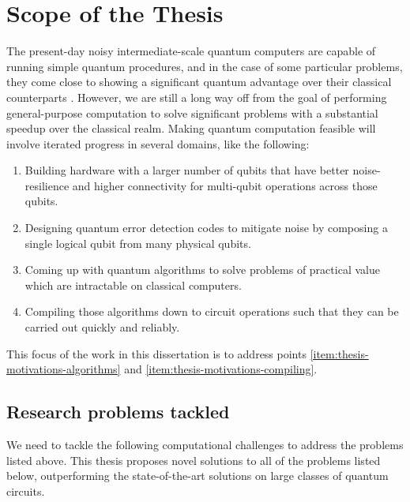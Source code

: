 \section{Scope of the Thesis}

The present-day noisy intermediate-scale quantum computers are capable of running simple quantum procedures, and in the case of some particular problems, they come close to showing a significant quantum advantage over their classical counterparts \cite{google-quantum-supremacy}. However, we are still a long way off from the goal of performing general-purpose computation to solve significant problems with a substantial speedup over the classical realm. Making quantum computation feasible will involve iterated progress in several domains, like the following:
\begin{enumerate}
    \item Building hardware with a larger number of qubits that have better noise-resilience and higher connectivity for multi-qubit operations across those qubits. 
    \item Designing quantum error detection codes to mitigate noise by composing a single logical qubit from many physical qubits.
    \item \label{item:thesis-motivations-algorithms} Coming up with quantum algorithms to solve problems of practical value which are intractable on classical computers.
    \item \label{item:thesis-motivations-compiling} Compiling those algorithms down to circuit operations such that they can be carried out quickly and reliably.
\end{enumerate}

This focus of the work in this dissertation is to address points \ref{item:thesis-motivations-algorithms} and \ref{item:thesis-motivations-compiling}.

\subsection{Research problems tackled}

We need to tackle the following computational challenges to address the problems listed above. This thesis proposes novel solutions to all of the problems listed below, outperforming the state-of-the-art solutions on large classes of quantum circuits.

